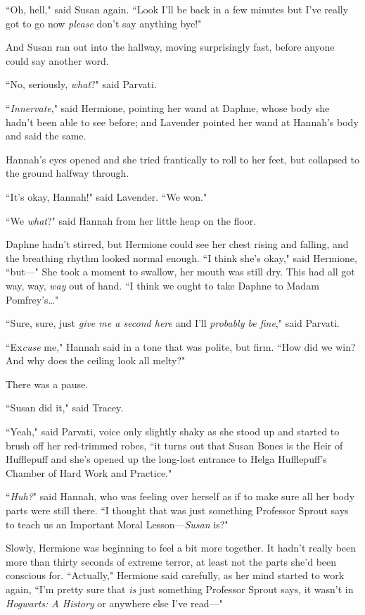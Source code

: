``Oh, hell," said Susan again. ``Look I'll be back in a few minutes but I've really got to go now \emph{please} don't say anything bye!"

And Susan ran out into the hallway, moving surprisingly fast, before anyone could say another word.

``No, seriously, \emph{what}?" said Parvati.

``\emph{Innervate}," said Hermione, pointing her wand at Daphne, whose body she hadn't been able to see before; and Lavender pointed her wand at Hannah's body and said the same.

Hannah's eyes opened and she tried frantically to roll to her feet, but collapsed to the ground halfway through.

``It's okay, Hannah!" said Lavender. ``We won."

``We \emph{what}?" said Hannah from her little heap on the floor.

Daphne hadn't stirred, but Hermione could see her chest rising and falling, and the breathing rhythm looked normal enough. ``I think she's okay," said Hermione, ``but—" She took a moment to swallow, her mouth was still dry. This had all got way, way, \emph{way} out of hand. ``I think we ought to take Daphne to Madam Pomfrey's{\ldots}"

``Sure, sure, just \emph{give me a second here} and I'll \emph{probably be fine}," said Parvati.

``Ex\emph{cuse} me," Hannah said in a tone that was polite, but firm. ``How did we win? And why does the ceiling look all melty?"

There was a pause.

``Susan did it," said Tracey.

``Yeah," said Parvati, voice only slightly shaky as she stood up and started to brush off her red-trimmed robes, ``it turns out that Susan Bones is the Heir of Hufflepuff and she's opened up the long-lost entrance to Helga Hufflepuff's Chamber of Hard Work and Practice."

``\emph{Huh?}" said Hannah, who was feeling over herself as if to make sure all her body parts were still there. ``I thought that was just something Professor Sprout says to teach us an Important Moral Lesson—\emph{Susan} is?"

Slowly, Hermione was beginning to feel a bit more together. It hadn't really been more than thirty seconds of extreme terror, at least not the parts she'd been conscious for. ``Actually," Hermione said carefully, as her mind started to work again, ``I'm pretty sure that \emph{is} just something Professor Sprout says, it wasn't in \emph{Hogwarts: A History} or anywhere else I've read—"

